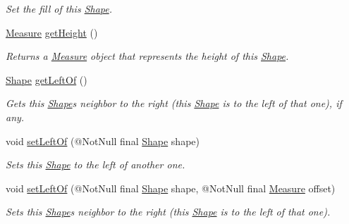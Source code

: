 \begin{DoxyCompactItemize}
\begin{DoxyCompactList}\small\item\em Set the fill of this \hyperlink{classcom_1_1aarrelaakso_1_1drawl_1_1_shape}{Shape}. \end{DoxyCompactList}\item 
\hyperlink{classcom_1_1aarrelaakso_1_1drawl_1_1_measure}{Measure} \hyperlink{classcom_1_1aarrelaakso_1_1drawl_1_1_shape_ac9f74d31c332aab76b329edc22080e67}{get\+Height} ()
\begin{DoxyCompactList}\small\item\em Returns a \hyperlink{classcom_1_1aarrelaakso_1_1drawl_1_1_measure}{Measure} object that represents the height of this \hyperlink{classcom_1_1aarrelaakso_1_1drawl_1_1_shape}{Shape}. \end{DoxyCompactList}\item 
\hyperlink{classcom_1_1aarrelaakso_1_1drawl_1_1_shape}{Shape} \hyperlink{classcom_1_1aarrelaakso_1_1drawl_1_1_shape_a2b19d5964ac46d545a7bae3133df6532}{get\+Left\+Of} ()
\begin{DoxyCompactList}\small\item\em Gets this \hyperlink{classcom_1_1aarrelaakso_1_1drawl_1_1_shape}{Shape}\textquotesingle{}s neighbor to the right (this \hyperlink{classcom_1_1aarrelaakso_1_1drawl_1_1_shape}{Shape} is to the left of that one), if any. \end{DoxyCompactList}\item 
void \hyperlink{classcom_1_1aarrelaakso_1_1drawl_1_1_shape_a0aef56392d76202235a9520394e87492}{set\+Left\+Of} (@Not\+Null final \hyperlink{classcom_1_1aarrelaakso_1_1drawl_1_1_shape}{Shape} shape)
\begin{DoxyCompactList}\small\item\em Sets this \hyperlink{classcom_1_1aarrelaakso_1_1drawl_1_1_shape}{Shape} to the left of another one. \end{DoxyCompactList}\item 
void \hyperlink{classcom_1_1aarrelaakso_1_1drawl_1_1_shape_a8012a3823982d77b563ef61787ccb523}{set\+Left\+Of} (@Not\+Null final \hyperlink{classcom_1_1aarrelaakso_1_1drawl_1_1_shape}{Shape} shape, @Not\+Null final \hyperlink{classcom_1_1aarrelaakso_1_1drawl_1_1_measure}{Measure} offset)
\begin{DoxyCompactList}\small\item\em Sets this \hyperlink{classcom_1_1aarrelaakso_1_1drawl_1_1_shape}{Shape}\textquotesingle{}s neighbor to the right (this \hyperlink{classcom_1_1aarrelaakso_1_1drawl_1_1_shape}{Shape} is to the left of that one). \end{DoxyCompactList}\item 

\end{DoxyCompactItemize}
